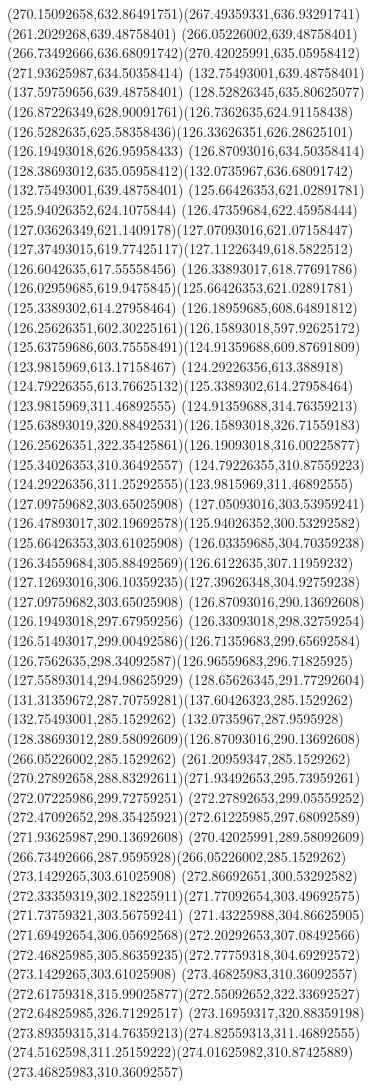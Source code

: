 {{{\curveto(270.15092658,632.86491751)(267.49359331,636.93291741)(261.2029268,639.48758401)
\lineto(266.05226002,639.48758401)
\curveto(266.73492666,636.68091742)(270.42025991,635.05958412)(271.93625987,634.50358414)
\moveto(132.75493001,639.48758401)
\lineto(137.59759656,639.48758401)
\curveto(128.52826345,635.80625077)(126.87226349,628.90091761)(126.7362635,624.91158438)
\curveto(126.5282635,625.58358436)(126.33626351,626.28625101)(126.19493018,626.95958433)
\lineto(126.87093016,634.50358414)
\curveto(128.38693012,635.05958412)(132.0735967,636.68091742)(132.75493001,639.48758401)
\moveto(125.66426353,621.02891781)
\lineto(125.94026352,624.1075844)
\curveto(126.47359684,622.45958444)(127.03626349,621.1409178)(127.07093016,621.07158447)
\curveto(127.37493015,619.77425117)(127.11226349,618.5822512)(126.6042635,617.55558456)
\curveto(126.33893017,618.77691786)(126.02959685,619.9475845)(125.66426353,621.02891781)
\moveto(125.3389302,614.27958464)
\curveto(126.18959685,608.64891812)(126.25626351,602.30225161)(126.15893018,597.92625172)
\curveto(125.63759686,603.75558491)(124.91359688,609.87691809)(123.9815969,613.17158467)
\curveto(124.29226356,613.388918)(124.79226355,613.76625132)(125.3389302,614.27958464)
\moveto(123.9815969,311.46892555)
\curveto(124.91359688,314.76359213)(125.63893019,320.88492531)(126.15893018,326.71559183)
\curveto(126.25626351,322.35425861)(126.19093018,316.00225877)(125.34026353,310.36492557)
\curveto(124.79226355,310.87559223)(124.29226356,311.25292555)(123.9815969,311.46892555)
\moveto(127.09759682,303.65025908)
\curveto(127.05093016,303.53959241)(126.47893017,302.19692578)(125.94026352,300.53292582)
\lineto(125.66426353,303.61025908)
\curveto(126.03359685,304.70359238)(126.34559684,305.88492569)(126.6122635,307.11959232)
\curveto(127.12693016,306.10359235)(127.39626348,304.92759238)(127.09759682,303.65025908)
\moveto(126.87093016,290.13692608)
\lineto(126.19493018,297.67959256)
\curveto(126.33093018,298.32759254)(126.51493017,299.00492586)(126.71359683,299.65692584)
\curveto(126.7562635,298.34092587)(126.96559683,296.71825925)(127.55893014,294.98625929)
\curveto(128.65626345,291.77292604)(131.31359672,287.70759281)(137.60426323,285.1529262)
\lineto(132.75493001,285.1529262)
\curveto(132.0735967,287.9595928)(128.38693012,289.58092609)(126.87093016,290.13692608)
\moveto(266.05226002,285.1529262)
\lineto(261.20959347,285.1529262)
\curveto(270.27892658,288.83292611)(271.93492653,295.73959261)(272.07225986,299.72759251)
\curveto(272.27892653,299.05559252)(272.47092652,298.35425921)(272.61225985,297.68092589)
\lineto(271.93625987,290.13692608)
\curveto(270.42025991,289.58092609)(266.73492666,287.9595928)(266.05226002,285.1529262)
\moveto(273.1429265,303.61025908)
\lineto(272.86692651,300.53292582)
\curveto(272.33359319,302.18225911)(271.77092654,303.49692575)(271.73759321,303.56759241)
\curveto(271.43225988,304.86625905)(271.69492654,306.05692568)(272.20292653,307.08492566)
\curveto(272.46825985,305.86359235)(272.77759318,304.69292572)(273.1429265,303.61025908)
\moveto(273.46825983,310.36092557)
\curveto(272.61759318,315.99025877)(272.55092652,322.33692527)(272.64825985,326.71292517)
\curveto(273.16959317,320.88359198)(273.89359315,314.76359213)(274.82559313,311.46892555)
\curveto(274.5162598,311.25159222)(274.01625982,310.87425889)(273.46825983,310.36092557)
}
}

}
